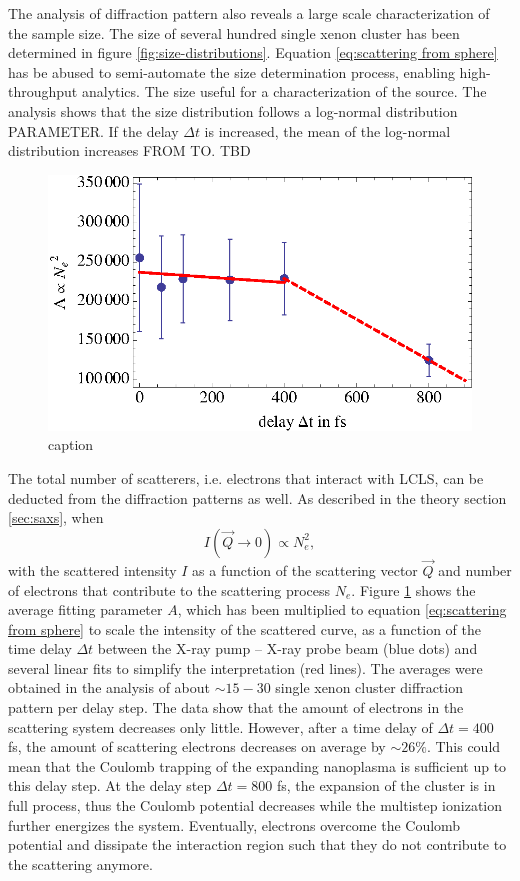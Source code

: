 The analysis of diffraction pattern also reveals a large scale characterization of the sample size. The size of several hundred single xenon cluster has been determined in figure \ref{fig:size-distributions}. Equation \eqref{eq:scattering from sphere} has be abused to semi-automate the size determination process, enabling high-throughput analytics. The size useful for a characterization of the source. The analysis shows that the size distribution follows a log-normal distribution PARAMETER. If the delay $\Delta t$ is increased, the mean of the log-normal distribution increases FROM TO. TBD
\begin{figure}
	\centering
		\includegraphics[width=1.00\textwidth]{images/results/number-of-scatterer.eps}
	\caption{caption}
	\label{fig:number-of-scatterer}
\end{figure}
The total number of scatterers, i.e. electrons that interact with LCLS, can be deducted from the diffraction patterns as well. As described in the theory section \ref{sec:saxs}, when
\begin{equation}
I\left(\vec{Q}\rightarrow 0\right)\propto N_{e}^{2},
\label{eq:}
\end{equation}
with the scattered intensity $I$ as a function of the scattering vector $\vec{Q}$ and number of electrons that contribute to the scattering process $N_{e}$. Figure \ref{fig:number-of-scatterer} shows the average fitting parameter $A$, which has been multiplied to equation \eqref{eq:scattering from sphere} to scale the intensity of the scattered curve, as a function of the time delay $\Delta t$ between the X-ray pump -- X-ray probe beam (blue dots) and several linear fits to simplify the interpretation (red lines). The averages were obtained in the analysis of about $\sim 15-30$ single xenon cluster diffraction pattern per delay step. The data show that the amount of electrons in the scattering system decreases only little. However, after a time delay of $\Delta t=400$ fs, the amount of scattering electrons decreases on average by $\sim 26 \%$. This could mean that the Coulomb trapping of the expanding nanoplasma is sufficient up to this delay step. At the delay step $\Delta t =800$ fs, the expansion of the cluster is in full process, thus the Coulomb potential decreases while the multistep ionization further energizes the system. Eventually, electrons overcome the Coulomb potential and dissipate the interaction region such that they do not contribute to the scattering anymore.
%
%
%
